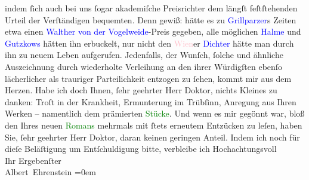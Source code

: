                indem ſich auch bei uns ſogar akademiſche Preisrichter dem längſt feſtſtehenden
               Urteil der Verſtändigen bequemten. Denn gewiß: hätte es zu \textcolor{blue}{Grillparzer}{}\ledrightnote{\textcolor{blue}{Franz Grillparzer}}s Zeiten etwa einen \textcolor{blue}{Walther von der Vogelweide}{}\ledrightnote{\textcolor{blue}{Walther von der Vogelweide}}-Preis gegeben, alle möglichen \textcolor{blue}{Halme}{}\ledrightnote{\textcolor{blue}{Friedrich Halm}} und \textcolor{blue}{Gutzkows}{}\ledrightnote{\textcolor{blue}{Karl Gutzkow}} hätten
               ihn erbuckelt, nur nicht den \textcolor{pink}{Wien}{}\ledrightnote{\textcolor{pink}{Wien}}er \textcolor{blue}{Dichter}{} hätte man durch ihn zu neuem Leben
               aufgerufen.\pend
           \pstart
           Jedenfalls, der Wunſch, ſolche und ähnliche Auszeichnung durch wiederholte {\pb}Verleihung an den ihrer Würdigſten ebenſo
               lächerlicher als trauriger Parteilichkeit entzogen zu ſehen, kommt mir aus dem
               Herzen. Habe ich doch Ihnen, ſehr geehrter Herr Doktor, nichts Kleines zu danken:
               Troſt in der Krankheit, Ermunterung im Trübſinn, Anregung aus Ihren Werken –
               namentlich dem prämierten \textcolor{green}{Stücke}{}.
               Und wenn es mir gegönnt war, bloß den \label{K_L01751_2v}\label{K_L01751_2h} Ihres
               neuen \textcolor{green}{Romans}{} mehrmals mit ſtets
               erneutem Entzücken zu leſen, haben Sie, ſehr geehrter Herr Doktor, daran keinen
               geringen Anteil.\pend
           \pstart
           {\pb}Indem ich noch für dieſe Beläſtigung um
               Entſchuldigung bitte, verbleibe ich\pend
           \pstart
           Hochachtungsvoll{\\[\baselineskip]}Ihr Ergebenſter{\\[\baselineskip]}\spacefill\mbox{Albert Ehrenstein}\pend
           \leftskip=0em{}\endnumbering{}  
      